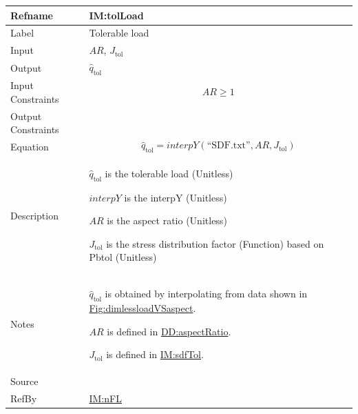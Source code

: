 \documentclass[12pt]{article}
\begin{document}
\medskip
\noindent
\begin{minipage}{\textwidth}
\begin{tabular}{>{\raggedright}p{}>{\raggedright\arraybackslash}p{}}
\toprule \textbf{Refname} & \textbf{IM:tolLoad}
\label{IM:tolLoad}
\\ \midrule
Label & Tolerable load
        
\\ \midrule
Input & $\mathit{AR}$, ${J_{\text{tol}}}$
        
\\ \midrule
Output & ${\hat{q}_{\text{tol}}}$
         
\\ \midrule
Input Constraints & \begin{displaymath}
                    \mathit{AR}\geq{}1
                    \end{displaymath}
\\ \midrule
Output Constraints & 
\\ \midrule
Equation & \begin{displaymath}
           {\hat{q}_{\text{tol}}}=\mathit{interpY}\left(\text{``SDF.txt''},\mathit{AR},{J_{\text{tol}}}\right)
           \end{displaymath}
\\ \midrule
Description & \begin{symbDescription}
              \item{${\hat{q}_{\text{tol}}}$ is the tolerable load (Unitless)}
              \item{$\mathit{interpY}$ is the interpY (Unitless)}
              \item{$\mathit{AR}$ is the aspect ratio (Unitless)}
              \item{${J_{\text{tol}}}$ is the stress distribution factor (Function) based on Pbtol (Unitless)}
              \end{symbDescription}
\\ \midrule
Notes & ${\hat{q}_{\text{tol}}}$ is obtained by interpolating from data shown in \hyperref[Figure:dimlessloadVSaspect]{Fig:dimlessloadVSaspect}.
        
        $\mathit{AR}$ is defined in \hyperref[DD:aspectRatio]{DD:aspectRatio}.
        
        ${J_{\text{tol}}}$ is defined in \hyperref[IM:sdfTol]{IM:sdfTol}.
        
\\ \midrule
Source & \cite{astm2009}
         
\\ \midrule
RefBy & \hyperref[IM:nFL]{IM:nFL}
        
\\ \bottomrule
\end{tabular}
\end{minipage}
\end{document}
